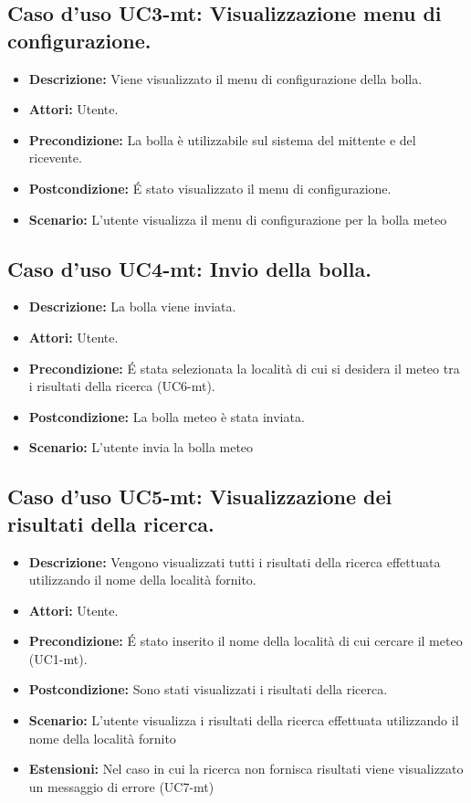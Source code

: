 \subsection{Caso d'uso UC3-mt: Visualizzazione menu di configurazione.}
\begin{itemize}
\item[]\textbf{Descrizione:} Viene visualizzato il menu di configurazione della bolla.
\item[]\textbf{Attori:} Utente. 
\item[]\textbf{Precondizione:} La bolla è utilizzabile sul sistema del mittente e del ricevente. 
\item[]\textbf{Postcondizione:} \'E stato visualizzato il menu di configurazione. 
\item[]\textbf{Scenario:}
L'utente visualizza il menu di configurazione per la bolla meteo 
\end{itemize}

\subsection{Caso d'uso UC4-mt: Invio della bolla.}
\begin{itemize}
\item[]\textbf{Descrizione:} La bolla viene inviata.
\item[]\textbf{Attori:} Utente. 
\item[]\textbf{Precondizione:} \'E stata selezionata la località di cui si desidera il meteo tra i risultati della ricerca (UC6-mt). 
\item[]\textbf{Postcondizione:} La bolla meteo è stata inviata. 
\item[]\textbf{Scenario:}
L'utente invia la bolla meteo 
\end{itemize}

\subsection{Caso d'uso UC5-mt: Visualizzazione dei risultati della ricerca.}
\begin{itemize}
\item[]\textbf{Descrizione:} Vengono visualizzati tutti i risultati della ricerca effettuata utilizzando il nome della località fornito.
\item[]\textbf{Attori:} Utente. 
\item[]\textbf{Precondizione:} \'E stato inserito il nome della località di cui cercare il meteo (UC1-mt). 
\item[]\textbf{Postcondizione:} Sono stati visualizzati i risultati della ricerca. 
\item[]\textbf{Scenario:}
L'utente visualizza i risultati della ricerca effettuata utilizzando il nome della località fornito 
\item[]\textbf{Estensioni:}
Nel caso in cui la ricerca non fornisca risultati viene visualizzato un messaggio di errore (UC7-mt) 
\end{itemize}

